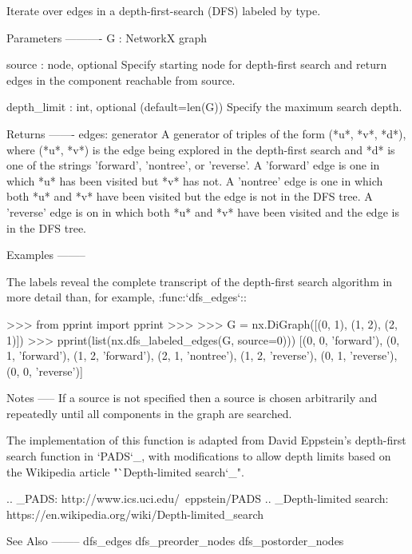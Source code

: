 \begin{DoxyVerb}Iterate over edges in a depth-first-search (DFS) labeled by type.

Parameters
----------
G : NetworkX graph

source : node, optional
   Specify starting node for depth-first search and return edges in
   the component reachable from source.

depth_limit : int, optional (default=len(G))
   Specify the maximum search depth.

Returns
-------
edges: generator
   A generator of triples of the form (*u*, *v*, *d*), where (*u*,
   *v*) is the edge being explored in the depth-first search and *d*
   is one of the strings 'forward', 'nontree', or 'reverse'. A
   'forward' edge is one in which *u* has been visited but *v* has
   not. A 'nontree' edge is one in which both *u* and *v* have been
   visited but the edge is not in the DFS tree. A 'reverse' edge is
   on in which both *u* and *v* have been visited and the edge is in
   the DFS tree.

Examples
--------

The labels reveal the complete transcript of the depth-first search
algorithm in more detail than, for example, :func:`dfs_edges`::

    >>> from pprint import pprint
    >>>
    >>> G = nx.DiGraph([(0, 1), (1, 2), (2, 1)])
    >>> pprint(list(nx.dfs_labeled_edges(G, source=0)))
    [(0, 0, 'forward'),
     (0, 1, 'forward'),
     (1, 2, 'forward'),
     (2, 1, 'nontree'),
     (1, 2, 'reverse'),
     (0, 1, 'reverse'),
     (0, 0, 'reverse')]

Notes
-----
If a source is not specified then a source is chosen arbitrarily and
repeatedly until all components in the graph are searched.

The implementation of this function is adapted from David Eppstein's
depth-first search function in `PADS`_, with modifications
to allow depth limits based on the Wikipedia article
"`Depth-limited search`_".

.. _PADS: http://www.ics.uci.edu/~eppstein/PADS
.. _Depth-limited search: https://en.wikipedia.org/wiki/Depth-limited_search

See Also
--------
dfs_edges
dfs_preorder_nodes
dfs_postorder_nodes
\end{DoxyVerb}
 \mbox{\label{namespacenetworkx_1_1algorithms_1_1traversal_1_1depth__first__search_a467537ebc879a51c749e7ccd7d4ff0f7}} 
